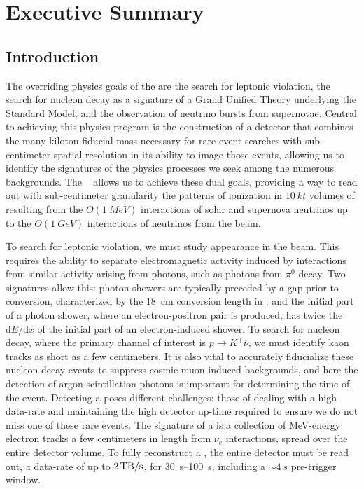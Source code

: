 \chapter{Executive Summary}
\label{ch:fdsp-execsum}

\section{Introduction}
\label{sec:fdsp-exec-introduction}


The overriding physics goals of the  are the search for leptonic  violation, the search for nucleon decay as a signature of a Grand Unified Theory underlying the Standard Model, and the observation of neutrino bursts from supernovae. Central to achieving this physics program is the construction of a detector that combines the many-kiloton fiducial mass necessary for rare event searches with sub-centimeter spatial resolution in its ability to image those events, allowing us to identify the signatures of the physics processes we seek among the numerous backgrounds. The  ~\cite{Rubbia:1977zz} allows us to achieve these dual goals, providing a way to read out with sub-centimeter granularity the patterns of ionization in $\SI{10}{kt}$ volumes of  resulting from the $O(\SI{1}{MeV})$ interactions of solar and supernova neutrinos up to the $O(\SI{1}{GeV})$ interactions of neutrinos from the  beam.

To search for leptonic  violation, we must study \nue appearance in the  \numu beam. This requires the ability to separate electromagnetic activity induced by  \nue interactions from similar activity arising from photons, such as photons from $\pi^{0}$ decay. Two signatures allow this: photon showers are typically preceded by a gap prior to conversion, characterized by the \SI{18}{cm} conversion length in ; and the initial part of a photon shower, where an electron-positron pair is produced, has twice the $\mathrm{d}E/\mathrm{d}x$ of the initial part of an electron-induced shower. To search for nucleon decay, where the primary channel of interest is $p\rightarrow K^{+}\overline{\nu}$, we must identify kaon tracks as short as a few centimeters. It is also vital to accurately fiducialize these nucleon-decay events to suppress cosmic-muon-induced backgrounds, and here the detection of argon-scintillation photons is important for determining the time of the event. Detecting a  poses different challenges: those of dealing with a high data-rate and maintaining the high detector up-time required to ensure we do not miss one of these rare events. The signature of a  is a collection of MeV-energy electron tracks a few centimeters in length from  $\nu_{e}$ interactions, spread over the entire detector volume. To fully reconstruct a , the entire detector must be read out, a data-rate of up to $\SI{2}{\tera\byte/\second}$, for \SIrange{30}{100}{s}, including a $\sim\!\SI{4}{s}$ pre-trigger window.

